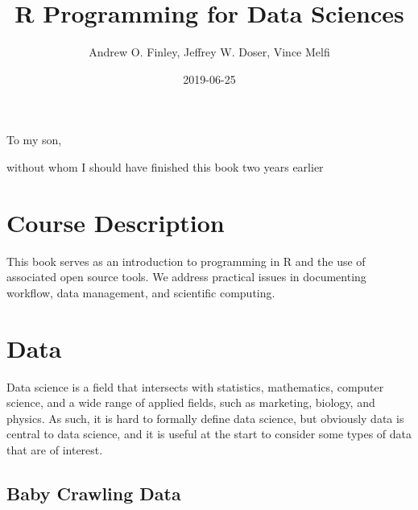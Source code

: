 \documentclass[]{krantz}
\title{R Programming for Data Sciences}
\author{Andrew O. Finley, Jeffrey W. Doser, Vince Melfi}
\date{2019-06-25}
\begin{document}
\maketitle


\thispagestyle{empty}

\begin{center}
To my son,

without whom I should have finished this book two years earlier
\end{center}

\setlength{\abovedisplayskip}{-5pt}
\setlength{\abovedisplayshortskip}{-5pt}

{
\hypersetup{linkcolor=black}
\setcounter{tocdepth}{2}
\tableofcontents
}
\listoftables
\listoffigures
\chapter*{Course Description}\label{course-description}


This book serves as an introduction to programming in R and the use of
associated open source tools. We address practical issues in documenting
workflow, data management, and scientific computing.

\mainmatter

\chapter{Data}\label{data}

Data science is a field that intersects with statistics, mathematics,
computer science, and a wide range of applied fields, such as marketing,
biology, and physics. As such, it is hard to formally define data
science, but obviously data is central to data science, and it is useful
at the start to consider some types of data that are of interest.

\section{Baby Crawling Data}\label{baby-crawling-data}
\end{document}
